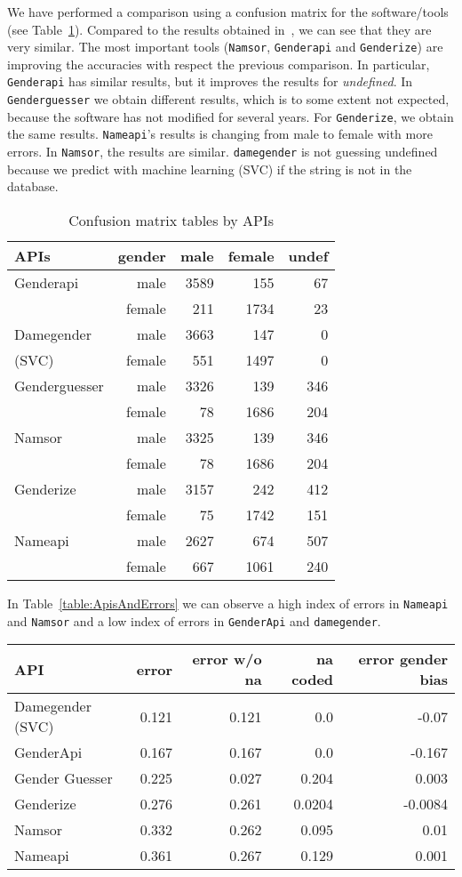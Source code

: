 \documentclass[a4paper]{article}
\begin{document}
We have performed a comparison using a confusion matrix for the software/tools (see Table~\ref{table:ConfusionMatrixTables}).
Compared to the results obtained in~\cite{10.7717/peerj-cs.156}, we can see that they are very similar.
The most important tools (\texttt{Namsor}, \texttt{Genderapi} and \texttt{Genderize}) are improving the accuracies with respect the previous comparison.
In particular, \texttt{Genderapi} has similar results, but it improves the results for \emph{undefined}.
In \texttt{Genderguesser} we obtain different results, which is to some extent not expected, because the software has not modified for several years.
For \texttt{Genderize}, we obtain the same results. 
\texttt{Nameapi}'s results is changing from male to female with more errors. 
In \texttt{Namsor}, the results are similar. 
\texttt{damegender} is not guessing undefined because we predict with machine learning (SVC) if the string is not in the database.

\begin{table}
\footnotesize
\begin{tabular}[]{lrrrr}
  \hline
  APIs          & gender & male & female & undef \tabularnewline
\hline
Genderapi         & male    & 3589 & 155  &  67 \tabularnewline
                  & female  & 211  & 1734 &  23 \tabularnewline
Damegender       & male    & 3663 & 147  &   0 \tabularnewline
(SVC)\footnotemark[1] & female  & 551  & 1497 &   0 \tabularnewline
Genderguesser     & male    & 3326 &  139 & 346 \tabularnewline
                  & female  & 78   & 1686 & 204 \tabularnewline
Namsor            & male    & 3325 & 139  & 346 \tabularnewline
                  & female  & 78   & 1686 & 204 \tabularnewline
Genderize         & male    & 3157 & 242  & 412 \tabularnewline
                  & female  & 75   & 1742 & 151 \tabularnewline
Nameapi           & male    & 2627 & 674  & 507 \tabularnewline
                  & female  & 667  & 1061 & 240 \tabularnewline 
\hline
\end{tabular}
\caption{Confusion matrix tables by APIs}
\label{table:ConfusionMatrixTables}
\end{table}


In Table~\ref{table:ApisAndErrors} we can observe a high index of errors in \texttt{Nameapi} and \texttt{Namsor} and a low index of errors in \texttt{GenderApi} and \texttt{damegender}.


\begin{table*}
\footnotesize
\begin{tabular}[]{lrrrr}
\hline
API & error & error w/o na & na coded & error gender bias\tabularnewline
\hline
Damegender (SVC)\footnotemark[1] & 0.121 & 0.121 & 0.0 & -0.07\tabularnewline
GenderApi & 0.167 & 0.167 & 0.0 & -0.167\tabularnewline
Gender Guesser & 0.225 & 0.027 & 0.204 & 0.003\tabularnewline
Genderize & 0.276 & 0.261 & 0.0204 & -0.0084 \tabularnewline 
Namsor & 0.332 & 0.262 & 0.095 & 0.01 \tabularnewline
Nameapi & 0.361 & 0.267 & 0.129 & 0.001 \tabularnewline
\hline
\end{tabular}
\caption{APIs and Errors}
\label{table:ApisAndErrors}
\end{table*}
\end{document}

